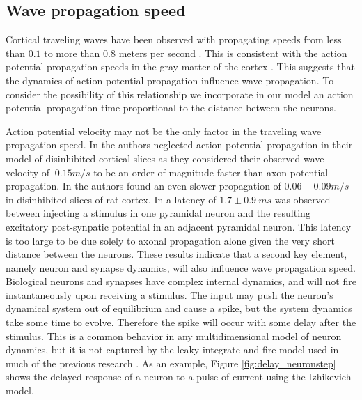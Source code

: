 \documentclass[12pt]{article}
\begin{document}
\subsection{Wave propagation speed} \label{sub:propagation_speed}
Cortical traveling waves have been observed with propagating speeds from less than $0.1$ to more than $0.8$ meters per second \parencite{Sato2012}\parencite{Golomb1997}\parencite{Chervin1988}.
This is consistent with the action potential propagation speeds in the gray matter of the cortex \parencite{Muller2018}. 
This suggests that the dynamics of action potential propagation influence wave propagation. 
To consider the possibility of this relationship we incorporate in our model an action potential propagation time proportional to the distance between the neurons.

Action potential velocity may not be the only factor in the traveling wave propagation speed.
In \parencite{Golomb1997} the authors neglected action potential propagation in their model of disinhibited cortical slices as they considered their observed wave velocity of $~0.15 m/s$ to be an order of magnitude faster than axon potential propagation.
In \parencite{Chervin1988} the authors found an even slower propagation of $0.06-0.09 m/s$ in disinhibited slices of rat cortex.
In  \parencite{Markram1997} a latency of $1.7\pm 0.9\ ms$ was observed between injecting a stimulus in one pyramidal neuron and the resulting excitatory post-synpatic potential in an adjacent pyramidal neuron.
This latency is too large to be due solely to axonal propagation alone given the very short distance between the neurons. 
These results indicate that a second key element, namely neuron and synapse dynamics, will also influence wave propagation speed.
Biological neurons and synapses  have complex internal dynamics, and will not fire instantaneously upon receiving a stimulus.
The input may push the neuron's dynamical system out of equilibrium and cause a spike, but the system dynamics take some time to evolve.
Therefore the spike will occur with some delay after the stimulus.
This is a common behavior in any multidimensional model of neuron dynamics, but it is not captured by the leaky integrate-and-fire model used in much of the previous research \parencite{keane2015}\parencite{Senk2020}.
As an example, Figure \ref{fig:delay_neuronstep} shows the delayed response of a neuron to a pulse of current using the Izhikevich model.
\end{document}

